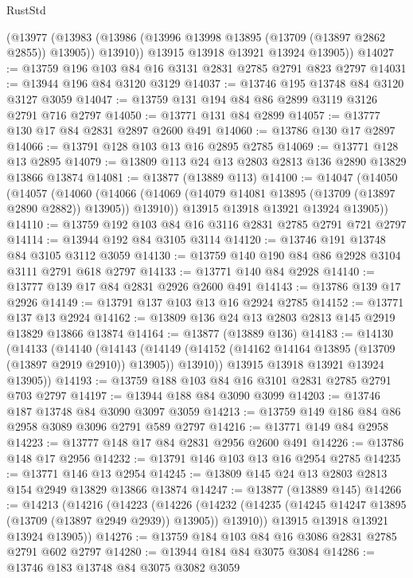 \begin{lexlean}{RustStd}
\begin{coremodule}
        (@13977
          (@13983 (@13986 (@13996 @13998 @13895 (@13709 (@13897 @2862 @2855)) @13905)) @13910))
        @13915
        @13918
        @13921
        @13924
        @13905))
@14027 := @13759 @196 @103 @84 @16 @3131 @2831 @2785 @2791 @823 @2797
@14031 := @13944 @196 @84 @3120 @3129
@14037 := @13746 @195 @13748 @84 @3120 @3127 @3059
@14047 := @13759 @131 @194 @84 @86 @2899 @3119 @3126 @2791 @716 @2797
@14050 := @13771 @131 @84 @2899
@14057 := @13777 @130 @17 @84 @2831 @2897 @2600 @491
@14060 := @13786 @130 @17 @2897
@14066 := @13791 @128 @103 @13 @16 @2895 @2785
@14069 := @13771 @128 @13 @2895
@14079 := @13809 @113 @24 @13 @2803 @2813 @136 @2890 @13829 @13866 @13874
@14081 := @13877 (@13889 @113)
@14100 := @14047
    (@14050
      (@14057
        (@14060
          (@14066 (@14069 (@14079 @14081 @13895 (@13709 (@13897 @2890 @2882)) @13905)) @13910))
        @13915
        @13918
        @13921
        @13924
        @13905))
@14110 := @13759 @192 @103 @84 @16 @3116 @2831 @2785 @2791 @721 @2797
@14114 := @13944 @192 @84 @3105 @3114
@14120 := @13746 @191 @13748 @84 @3105 @3112 @3059
@14130 := @13759 @140 @190 @84 @86 @2928 @3104 @3111 @2791 @618 @2797
@14133 := @13771 @140 @84 @2928
@14140 := @13777 @139 @17 @84 @2831 @2926 @2600 @491
@14143 := @13786 @139 @17 @2926
@14149 := @13791 @137 @103 @13 @16 @2924 @2785
@14152 := @13771 @137 @13 @2924
@14162 := @13809 @136 @24 @13 @2803 @2813 @145 @2919 @13829 @13866 @13874
@14164 := @13877 (@13889 @136)
@14183 := @14130
    (@14133
      (@14140
        (@14143
          (@14149 (@14152 (@14162 @14164 @13895 (@13709 (@13897 @2919 @2910)) @13905)) @13910))
        @13915
        @13918
        @13921
        @13924
        @13905))
@14193 := @13759 @188 @103 @84 @16 @3101 @2831 @2785 @2791 @703 @2797
@14197 := @13944 @188 @84 @3090 @3099
@14203 := @13746 @187 @13748 @84 @3090 @3097 @3059
@14213 := @13759 @149 @186 @84 @86 @2958 @3089 @3096 @2791 @589 @2797
@14216 := @13771 @149 @84 @2958
@14223 := @13777 @148 @17 @84 @2831 @2956 @2600 @491
@14226 := @13786 @148 @17 @2956
@14232 := @13791 @146 @103 @13 @16 @2954 @2785
@14235 := @13771 @146 @13 @2954
@14245 := @13809 @145 @24 @13 @2803 @2813 @154 @2949 @13829 @13866 @13874
@14247 := @13877 (@13889 @145)
@14266 := @14213
    (@14216
      (@14223
        (@14226
          (@14232 (@14235 (@14245 @14247 @13895 (@13709 (@13897 @2949 @2939)) @13905)) @13910))
        @13915
        @13918
        @13921
        @13924
        @13905))
@14276 := @13759 @184 @103 @84 @16 @3086 @2831 @2785 @2791 @602 @2797
@14280 := @13944 @184 @84 @3075 @3084
@14286 := @13746 @183 @13748 @84 @3075 @3082 @3059

\end{coremodule}
\end{lexlean}
